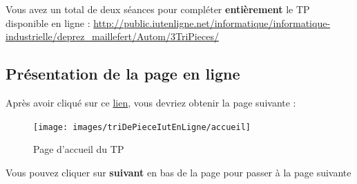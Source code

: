 \documentclass[11pt]{article}
\begin{document}
Vous avez un total de deux séances pour compléter \textbf{entièrement} le TP disponible en ligne : \url{http://public.iutenligne.net/informatique/informatique-industrielle/deprez_maillefert/Autom/3TriPieces/}

\subsection{Présentation de la page en ligne}
Après avoir cliqué sur ce \href{http://public.iutenligne.net/informatique/informatique-industrielle/deprez_maillefert/Autom/3TriPieces/}{lien}, vous devriez obtenir la page suivante :

\begin{figure}[h]
\texttt{[image: images/triDePieceIutEnLigne/accueil]}
	\caption{Page d'accueil du TP}
\end{figure}

Vous pouvez cliquer sur \textbf{suivant} en bas de la page pour passer à la page suivante
\end{document}
